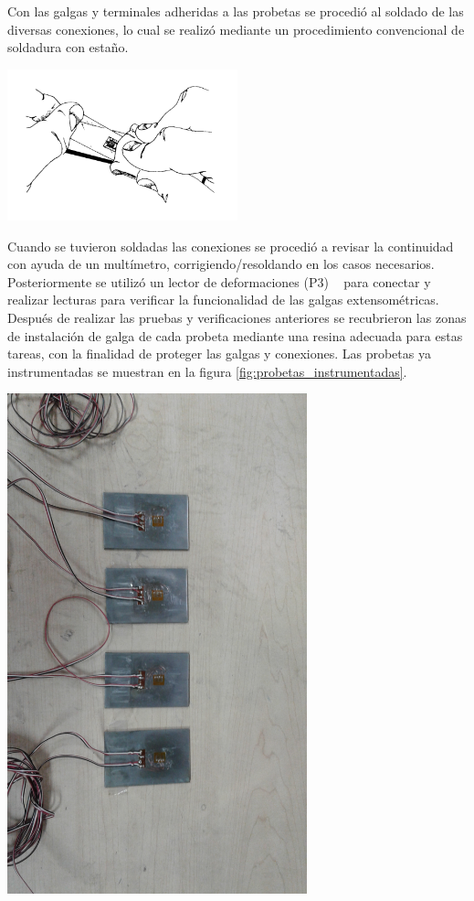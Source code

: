 Con las galgas y terminales adheridas a las probetas se procedió al soldado de las diversas conexiones, lo 
cual se realizó mediante un procedimiento convencional de soldadura con estaño.

\begin{center}
\includegraphics[width=0.5\textwidth]{src/ch3/deslizar_adhesivo.png}
\label{fig:deslizar_adhesivo}
\end{center}

Cuando se tuvieron soldadas las conexiones se procedió a revisar la continuidad con ayuda de un 
multímetro, corrigiendo/resoldando en los casos necesarios. Posteriormente se utilizó un lector 
de deformaciones (P3) ~\cite{p3indicator} para conectar y realizar lecturas para verificar la funcionalidad de las 
galgas extensométricas.\\

Después de realizar las pruebas y verificaciones anteriores se recubrieron las zonas de instalación 
de galga de cada probeta mediante una resina adecuada para estas tareas, con la finalidad de 
proteger las galgas y conexiones. Las probetas ya instrumentadas se muestran en la 
figura \ref{fig:probetas_instrumentadas}.

\begin{center}
\includegraphics[width=0.65\textwidth]{src/ch3/probetas_instrumentadas.jpg}
\label{fig:probetas_instrumentadas}
\end{center}


